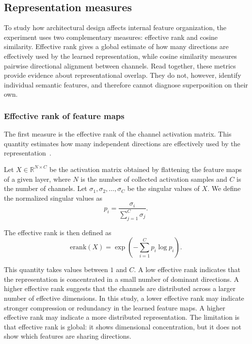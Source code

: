 \documentclass[12pt,a4paper]{report}
\begin{document}
\subsection{Representation measures}
To study how architectural design affects internal feature organization, the experiment uses two complementary measures: effective rank and cosine similarity. Effective rank gives a global estimate of how many directions are effectively used by the learned representation, while cosine similarity measures pairwise directional alignment between channels. Read together, these metrics provide evidence about representational overlap. They do not, however, identify individual semantic features, and therefore cannot diagnose superposition on their own.

\subsubsection{Effective rank of feature maps}
The first measure is the effective rank of the channel activation matrix. This quantity estimates how many independent directions are effectively used by the representation~\cite{roy2007effective}.

Let $X \in \mathbb{R}^{N \times C}$ be the activation matrix obtained by flattening the feature maps of a given layer, where $N$ is the number of collected activation samples and $C$ is the number of channels. Let $\sigma_1, \sigma_2, \dots, \sigma_C$ be the singular values of $X$. We define the normalized singular values as
\begin{equation}
p_i = \frac{\sigma_i}{\sum_{j=1}^{C} \sigma_j}.
\end{equation}

The effective rank is then defined as
\begin{equation}
\mathrm{erank}(X) = \exp\left(-\sum_{i=1}^{C} p_i \log p_i\right).
\end{equation}

This quantity takes values between \(1\) and \(C\). A low effective rank indicates that the representation is concentrated in a small number of dominant directions. A higher effective rank suggests that the channels are distributed across a larger number of effective dimensions. In this study, a lower effective rank may indicate stronger compression or redundancy in the learned feature maps. A higher effective rank may indicate a more distributed representation. The limitation is that effective rank is global: it shows dimensional concentration, but it does not show which features are sharing directions.
\end{document}
